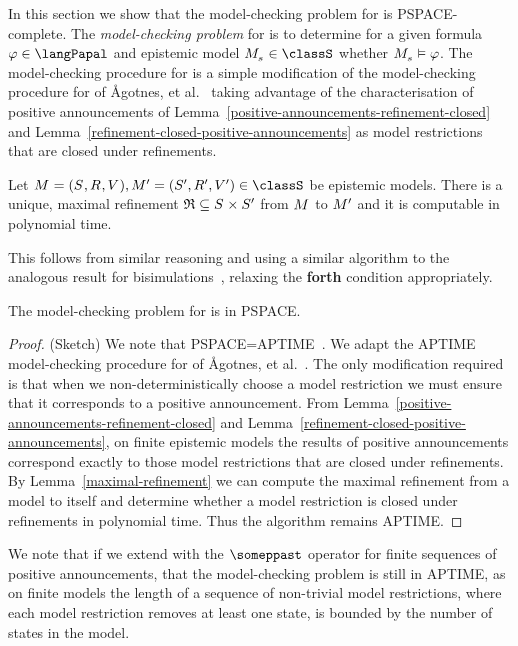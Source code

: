 In this section we show that the model-checking problem for \logicPapalS{} is PSPACE-complete.
The {\em model-checking problem} for \logicPapalS{} is to determine for a given formula $\phi \in \langPapal$ and epistemic model $\kPModel{\kStateS} \in \classS$ whether $\kPModel{\kStateS} \entails \phi$.
The model-checking procedure for \logicPapalS{} is a simple modification of the model-checking procedure for \logicApalS{} of Ågotnes, et al.~\cite{agotnes:2010} taking advantage of the characterisation of positive announcements of Lemma~\ref{positive-announcements-refinement-closed} and Lemma~\ref{refinement-closed-positive-announcements} as model restrictions that are closed under refinements.

\begin{lemma}\label{maximal-refinement}
Let $\kModelAndTuple, \kModelAndTuple[\prime] \in \classS$ be epistemic models.
There is a unique, maximal refinement $\refinement \subseteq \kStates \times \kStates[\prime]$ from $\kModel$ to $\kModel[\prime]$ and it is computable in polynomial time.
\end{lemma}

This follows from similar reasoning and using a similar algorithm to the analogous result for bisimulations~\cite{goranko:2006}, relaxing the {\bf forth} condition appropriately.

\begin{theorem}\label{papal-model-checking-pspace}
The model-checking problem for \logicPapalS{} is in PSPACE.
\end{theorem}

\begin{proof}{(Sketch)}
We note that PSPACE=APTIME~\cite{chandra:1981}.
We adapt the APTIME model-checking procedure for \logicApalS{} of Ågotnes, et al.~\cite{agotnes:2010}.
The only modification required is that when we non-deterministically choose a model restriction we must ensure that it corresponds to a positive announcement.
From Lemma~\ref{positive-announcements-refinement-closed} and Lemma~\ref{refinement-closed-positive-announcements}, on finite epistemic models the results of positive announcements correspond exactly to those model restrictions that are closed under refinements.
By Lemma~\ref{maximal-refinement} we can compute the maximal refinement from a model to itself and determine whether a model restriction is closed under refinements in polynomial time.
Thus the algorithm remains APTIME.
\end{proof}

We note that if we extend \logicPapalS{} with the $\someppast$ operator for finite sequences of positive announcements, that the model-checking problem is still in APTIME, as on finite models the length of a sequence of non-trivial model restrictions, where each model restriction removes at least one state, is bounded by the number of states in the model.

